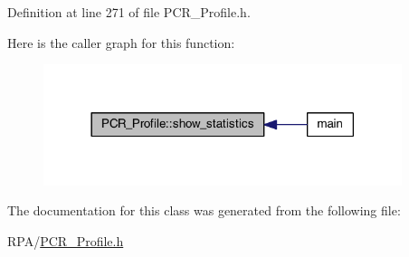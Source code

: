 Definition at line 271 of file P\+C\+R\+\_\+\+Profile.\+h.

Here is the caller graph for this function\+:
\nopagebreak
\begin{figure}[H]
\begin{center}
\leavevmode
\includegraphics[width=297pt]{class_p_c_r___profile_a9897676b415905e30809e69c399a859a_icgraph}
\end{center}
\end{figure}


The documentation for this class was generated from the following file\+:\begin{DoxyCompactItemize}
\item 
R\+P\+A/\mbox{\hyperlink{_p_c_r___profile_8h}{P\+C\+R\+\_\+\+Profile.\+h}}\end{DoxyCompactItemize}
